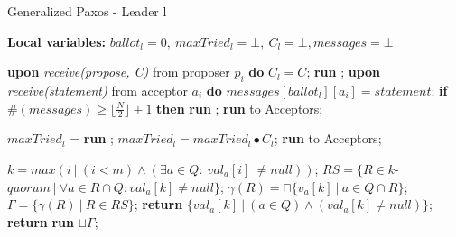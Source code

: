 \begin{algorithm}
	\caption{Generalized Paxos - Leader l}
	\textbf{Local variables:} $ballot_l = 0,\ maxTried_l = \bot,\ C_l = \bot, messages = \bot$
	\begin{algorithmic}[1]
		\State \textbf{upon} \textit{receive(propose, C)} from proposer $p_i$ \textbf{do} 
		\State \hspace{\algorithmicindent} $C_l = C$;
		\State \hspace{\algorithmicindent}\textbf{run} ;
		\State
		\State \textbf{upon} \textit{receive(statement)} from acceptor $a_i$ \textbf{do}
		\State \hspace{\algorithmicindent}  $messages[ballot_l][a_i] = statement$;
		\State \hspace{\algorithmicindent} \textbf{if} $\#(messages) \geq \lfloor \frac{N}{2} \rfloor +1$ \textbf{then} 
		\State \hspace{\algorithmicindent}\hspace{\algorithmicindent}\textbf{run} ;
		\State
		\State \textbf{run}  to Acceptors;
		\EndFunction
		
		\State
		\State $maxTried_l$ = \textbf{run} ;
		\State $maxTried_l = maxTried_l \bullet C_l$;
		\State \textbf{run}  to Acceptors;
		\EndFunction
		
		\State
		\State $k = max(i\ |\ (i < m) \wedge (\exists a \in Q :\ val_a[i]\ \neq null))$;
		\State $RS = \{R \in k$-$quorum\ |\ \forall a \in R \cap Q : val_a[k] \neq null\}$;
		\State $\gamma(R) = \sqcap \{v_a[k]\ |\ a \in Q \cap R \}$;
		\State $\Gamma = \{\gamma(R)\ |\ R \in RS \}$;
		\State
		\State \textbf{return} $\{val_a[k]\ |\ (a \in Q) \wedge (val_a[k] \neq null)\}$;
		\Else
		\State \textbf{return} \textbf{run} $\sqcup \Gamma$;
		\EndIf
		\EndFunction
		
	\end{algorithmic}
\end{algorithm}

